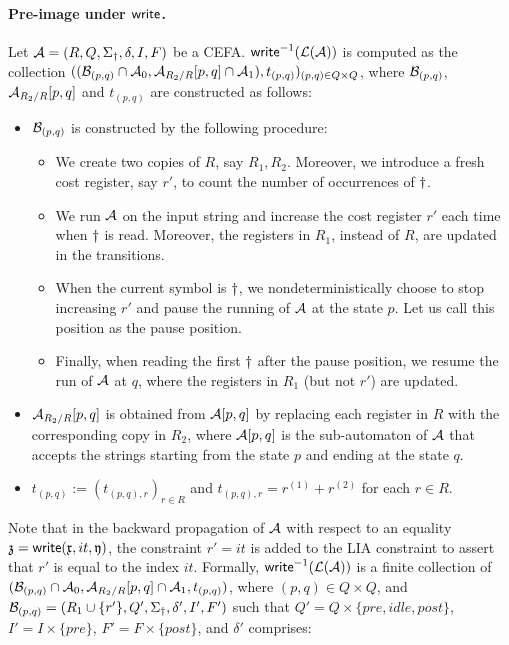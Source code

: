 \paragraph*{Pre-image under $\mathsf{write}$.}
Let $\mathcal{A} = (R, Q, \Sigma_{\dag}, \delta, I, F)$ be a CEFA.  $\mathsf{write}^{-1}(\mathcal{L}(\mathcal{A}))$ is computed as the collection $((\mathcal{B}_{(p, q)} \cap \mathcal{A}_0, \mathcal{A}_{R_2/R}[p, q] \cap \mathcal{A}_1), t_{(p,q)})_{(p, q) \in Q \times Q}$, where  $\mathcal{B}_{(p, q)}$, $ \mathcal{A}_{R_2/R}[p, q]$ and $t_{(p,q)}$ are constructed as follows:
\begin{itemize}%
\item $\mathcal{B}_{(p, q)}$ is constructed by the following procedure: 
\begin{itemize}
%
\item We create two copies of $R$, say $R_1, R_2$. Moreover, we introduce a fresh cost register, say $r'$, to count the number of occurrences of $\dag$. 
%
\item We run $\mathcal{A}$ on the input string and increase the cost register $r'$ each time when $\dag$ is read. Moreover, the registers in $R_1$, instead of $R$, are updated in the transitions. 
%
\item When the current symbol is $\dag$, we nondeterministically choose to stop increasing $r'$ and pause the running of $\mathcal{A}$ at the state $p$. Let us call this position as the pause position.
%
\item Finally, when reading the first $\dag$ after the pause position, we resume the run of $\mathcal{A}$ at $q$, where the registers in $R_1$ (but not $r'$) are updated. 
%
\end{itemize}

\item $\mathcal{A}_{R_2/R}[p, q]$ is obtained from $\mathcal{A}[p, q]$ by replacing each register in $R$ with the corresponding copy in $R_2$, where $\mathcal{A}[p, q]$ is the sub-automaton of $\mathcal{A}$ that accepts the strings starting from the state $p$ and ending at the state $q$.
%
\item $t_{(p, q)} := (t_{(p, q), r})_{r \in R}$ and 
$t_{(p, q), r} = r^{(1)} + r^{(2)}$  for each $r \in R$.
\end{itemize}
Note that in the backward propagation of $\mathcal{A}$ with respect to an equality $\mathfrak{z} = \mathsf{write}(\mathfrak{x}, it, \mathfrak{y})$, the constraint $r' = it $ is added to the LIA constraint to assert that $r'$ is equal to the index $it$. 
%
Formally, $\mathsf{write}^{-1}(\mathcal{L}(\mathcal{A}))$ is a finite collection of $(\mathcal{B}_{(p,q)}  \cap \mathcal{A}_0, \mathcal{A}_{R_2/R}[p, q] \cap \mathcal{A}_1, t_{(p,q)})$, where $(p, q) \in Q \times Q$, and $\mathcal{B}_{(p,q)} = (R_1 \cup \{r'\}, Q', \Sigma_{\dag}, \delta', I', F')$ such that  $Q' = Q \times \{pre, idle, post\}$, $I'  = I \times \{pre\}$, $F'  = F \times \{post\}$, and $\delta'$ comprises:

